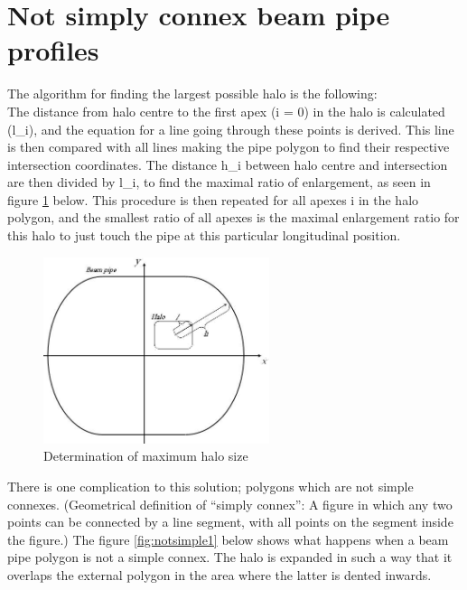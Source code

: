 \section{Not simply connex beam pipe profiles} 
\label{sec:notconnex}
The algorithm for finding the largest possible halo is the following: \\
The distance from halo centre to the first apex (i = 0)
in the halo is calculated (l\_i), and the equation for a line going
through these points is derived. This line is then compared with all
lines making the pipe polygon to find their respective intersection
coordinates. The distance h\_i between halo centre and intersection are
then divided by l\_i, to find the maximal ratio of enlargement, as seen
in figure \ref{fig:notsimple0} below. 
This procedure is then repeated for all apexes i in the halo
polygon, and the smallest ratio  of all apexes is the maximal
enlargement ratio for this halo to just touch the pipe at this
particular longitudinal position. 

\begin{figure}[h]
  \begin{center}
    \includegraphics[width=250px]{jpg/notsimple0.jpg}
    \caption{Determination of maximum halo size}
    \label{fig:notsimple0}
  \end{center}
\end{figure}

There is one complication to this solution; polygons which are not
simple connexes. (Geometrical definition of ``simply connex'': A figure
in which any two points can be connected by a line segment, with all
points on the segment inside the figure.) The figure \ref{fig:notsimple1}
below shows what happens when a beam pipe polygon is not a simple
connex. The halo is expanded in such a way that it overlaps the external
polygon in the area where the latter is dented inwards. 

